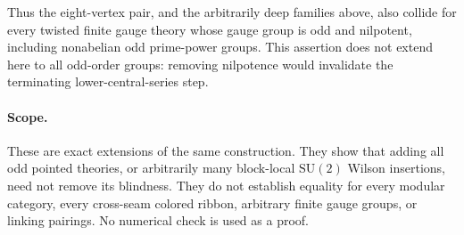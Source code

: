 Thus the eight-vertex pair, and the arbitrarily deep families above,
also collide for every twisted finite gauge theory whose gauge group is
odd and nilpotent, including nonabelian odd prime-power groups. This
assertion does not extend here to all odd-order groups: removing
nilpotence would invalidate the terminating lower-central-series step.

\paragraph{Scope.}
These are exact extensions of the same construction. They show that
adding all odd pointed theories, or arbitrarily many block-local
\(\mathrm{SU}(2)\) Wilson insertions, need not remove its blindness.
They do not establish equality for every modular category, every
cross-seam colored ribbon, arbitrary finite gauge groups, or linking
pairings. No numerical check is used as a proof.

